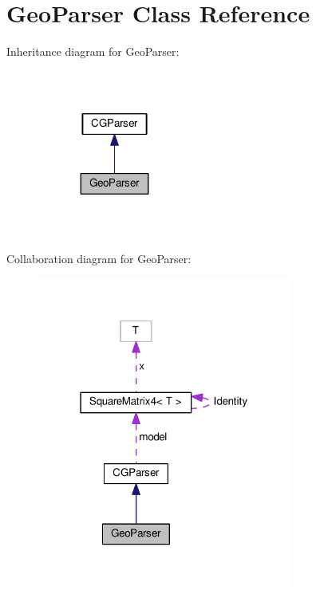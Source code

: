 \hypertarget{class_geo_parser}{}\section{Geo\+Parser Class Reference}
\label{class_geo_parser}


Inheritance diagram for Geo\+Parser\+:
\nopagebreak
\begin{figure}[H]
\begin{center}
\leavevmode
\includegraphics[width=143pt]{class_geo_parser__inherit__graph}
\end{center}
\end{figure}


Collaboration diagram for Geo\+Parser\+:
\nopagebreak
\begin{figure}[H]
\begin{center}
\leavevmode
\includegraphics[width=238pt]{class_geo_parser__coll__graph}
\end{center}
\end{figure}
